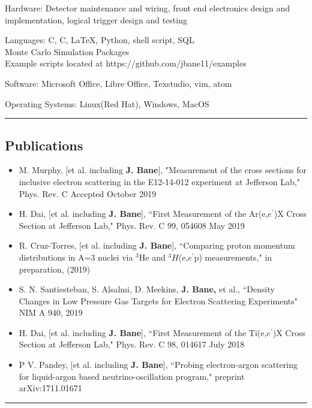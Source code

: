 \documentclass[12pt,letterpaper]{article}
\newenvironment{indentsection}[1]%
{\begin{list}{}%
	{\setlength{\leftmargin}{#1}}%
	\item[]%
}
{\end{list}}
\newcommand{\CPP}
{C\nolinebreak[4]\hspace{-.05em}\raisebox{.22ex}{\footnotesize\bf ++}}
\begin{document}
\begin{indentsection}{\parindent}
\begin{description*}
	\item[Hardware:]
	Detector maintenance and wiring, front end electronics design and implementation, logical trigger design and testing   
	\item[Languages:]
	C, \CPP, \LaTeX, Python, shell script, SQL \\
	Monte Carlo Simulation Packages\\
	Example scripts located at https://github.com/jbane11/examples
	\item[Software:]
	Microsoft Office, Libre Office, Texstudio, vim, atom
	\item[Operating Systems:]
	Linux(Red Hat), Windows, MacOS
	
\end{description*}
\end{indentsection}
\hrule
\subsection*{Publications}
\begin{itemize} \itemsep -2pt %
	\item   M. Murphy, [et al. including \textbf{J. Bane}], "Measurement of the cross sections for inclusive electron scattering in the E12-14-012 experiment at Jefferson Lab," Phys. Rev. C Accepted October 2019
	\item  H. Dai, [et al. including \textbf{J. Bane}], ``First Measurement of the Ar(e,$e^\prime$)X Cross Section at Jefferson Lab," Phys. Rev. C 99, 054608 May 2019
	\item R. Cruz-Torres, [et al. including \textbf{J. Bane}], ``Comparing proton momentum distributions in A=3 nuclei via $^3$He and $^3H$(e,$e^\prime$p) measurements," in preparation, (2019)
	\item S. N. Santiesteban, S. Alsalmi, D. Meekins, \textbf{J. Bane,} et al., ``Density Changes in Low Pressure Gas Targets for Electron Scattering Experiments" NIM A 940, 2019
	\item  H. Dai, [et al. including \textbf{J. Bane}], ``First Measurement of the Ti(e,$e^\prime$)X Cross Section at Jefferson Lab," Phys. Rev. C 98, 014617 July 2018
	\item P V. Pandey, [et al. including \textbf{J. Bane}], ``Probing electron-argon scattering for liquid-argon based neutrino-oscillation program," preprint arXiv:1711.01671
	
\end{itemize}
\hrule
\end{document}
